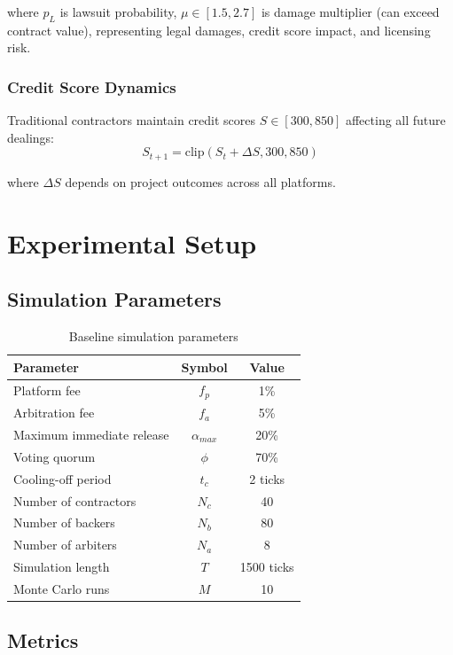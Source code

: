 \documentclass[11pt,a4paper]{article}
\begin{document}
where $p_L$ is lawsuit probability, $\mu \in [1.5, 2.7]$ is damage multiplier (can exceed contract value), representing legal damages, credit score impact, and licensing risk.

\subsubsection{Credit Score Dynamics}

Traditional contractors maintain credit scores $S \in [300, 850]$ affecting all future dealings:
\begin{equation}
    S_{t+1} = \text{clip}(S_t + \Delta S, 300, 850)
\end{equation}

where $\Delta S$ depends on project outcomes across all platforms.

\section{Experimental Setup}

\subsection{Simulation Parameters}

\begin{table}[H]
\centering
\caption{Baseline simulation parameters}
\label{tab:params}
\begin{tabular}{lcc}
\toprule
Parameter & Symbol & Value \\
\midrule
Platform fee & $f_p$ & 1\% \\
Arbitration fee & $f_a$ & 5\% \\
Maximum immediate release & $\alpha_{max}$ & 20\% \\
Voting quorum & $\phi$ & 70\% \\
Cooling-off period & $t_c$ & 2 ticks \\
Number of contractors & $N_c$ & 40 \\
Number of backers & $N_b$ & 80 \\
Number of arbiters & $N_a$ & 8 \\
Simulation length & $T$ & 1500 ticks \\
Monte Carlo runs & $M$ & 10 \\
\bottomrule
\end{tabular}
\end{table}

\subsection{Metrics}
\end{document}
